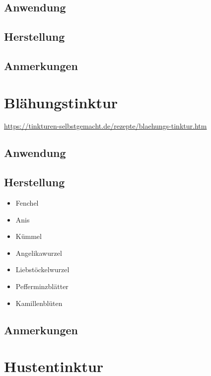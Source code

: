 \subsection{Anwendung}

\subsection{Herstellung}

\subsection{Anmerkungen}



\newpage



\section{Blähungstinktur}

\cite{tinkturen}  

\url{https://tinkturen-selbstgemacht.de/rezepte/blaehungs-tinktur.htm}

\subsection{Anwendung}


\subsection{Herstellung}


\begin{itemize}
	\item Fenchel
	\item Anis
	\item Kümmel
	\item Angelikawurzel
	\item Liebstöckelwurzel
	\item Pefferminzblätter
	\item Kamillenblüten
\end{itemize}

\subsection{Anmerkungen}



\newpage



\section{Hustentinktur}

